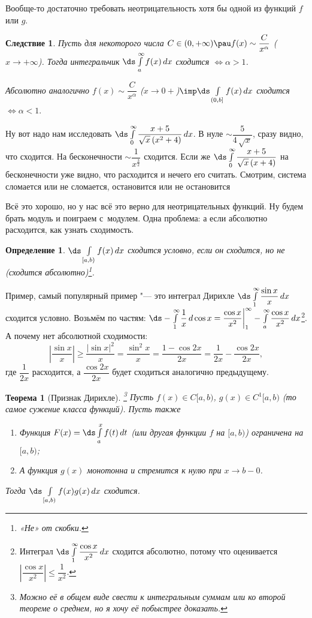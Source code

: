 \documentclass[a4paper,10pt,twoside]{article}
\newtheorem{Def}{Определение}[section]
\newtheorem{The}{Теорема}[section]
\newtheorem{Sl}{Следствие}[section]
\newenvironment{Zam}
     	{\par\noindent{\textbf{Замечание.}}}{}
\begin{document}
    \begin{Zam}
    Вообще-то достаточно требовать неотрицательность хотя бы одной из функций $f$ или $g$.
    \end{Zam}
    
    \begin{Sl}
    	Пусть для некоторого числа $C\in(0,+\infty)\pau f(x)\sim \dfrac{C}{x^\alpha}$ ($x\to+\infty$). Тогда интегральчик
    	$\ds\int\limits_a^\infty f(x)\,dx$ сходится $\iff\alpha>1$.
    	
    	Абсолютно аналогично $f(x)\sim\dfrac{C}{x^\alpha}$ ($x\to 0+$)$\imp\ds\int\limits_{(0,b]}f(x)\,dx$ сходится $\iff\alpha<1.$ 
    \end{Sl}
    
    Ну вот надо нам исследовать $\ds\int\limits_0^\infty\dfrac{x+5}{\sqrt x\,(x^2+4)}\,dx$. В нуле $\sim\dfrac5{4\,\sqrt x}$, сразу видно, что сходится. 
    На бесконечности $\sim\dfrac{1}{x^{\frac32}}$ сходится.
    Если же $\ds\int\limits_0^\infty\dfrac{x+5}{\sqrt x\,(x+4)}$ на бесконечности уже видно, что расходится и нечего его считать.
    Смотрим, система сломается или не сломается, остановится или не остановится\ldotst{}
    
    Всё это хорошо, но у нас всё это верно для неотрицательных функций. Ну будем брать модуль и поиграем с~модулем. Одна проблема: а если абсолютно 
    расходится, как узнать сходимость.
    \begin{Def}
    	$\ds\int\limits_{[a,b)}f(x)\,dx$ сходится условно, если он сходится, но не (сходится абсолютно)\footnote{«Не» от скобки.}.
    \end{Def}
    
    Пример, самый популярный пример "--- это интеграл Дирихле $\ds\int\limits_1^\infty\dfrac{\sin x}{x}\,dx$ сходится условно.
    Возьмём по частям: $\ds-\int\limits_1^\infty\dfrac1x\,d\cos x=\-\dfrac{\cos x}{x^2}\bigg|_1^\infty-\int\limits_a^\infty\dfrac{\cos x}{x^2}\,dx$\footnote{Интеграл $\ds\int\limits_1^\infty\dfrac{\cos x}{x^2}\,dx$ 
    сходится абсолютно, потому что оценивается $\left|\dfrac{\cos x}{x^2}\right|\leq\dfrac1{x^2}$.}.
    А почему нет абсолютной сходимости:\[
    	\left|\frac{\sin x}x\right|\geq\frac{|\sin x|^2}x=\frac{\sin^2 x}x=\frac{1-\cos 2x}{2x}=\frac1{2x}-\frac{\cos 2x}{2x},\]
    где $\dfrac1{2x}$ расходится, а $\dfrac{\cos 2x}{2x}$ будет сходиться аналогично предыдущему.
   
	\begin{The}[Признак Дирихле]\footnote{Можно её в общем виде свести к интегральным суммам или ко второй теореме о среднем, но я хочу её побыстрее доказать.}
	Пусть $f(x)\in C[a,b)$, $g(x)\in C^1[a,b)$ (то самое сужение класса функций). Пусть также
	\begin{enumerate}
	  \item Функция $F(x)=\ds\int\limits_a^xf(t)\,dt$ (или другая \tp{} функции $f$ на $[a,b)$) ограничена на $[a,b)$;
	  \item А функция $g(x)$ монотонна и стремится к нулю при $x\to b-0$.
	\end{enumerate}
	Тогда $\ds\int\limits_{[a,b)}f(x)g(x)\,dx$ сходится.
	\end{The}
	
\end{document}
